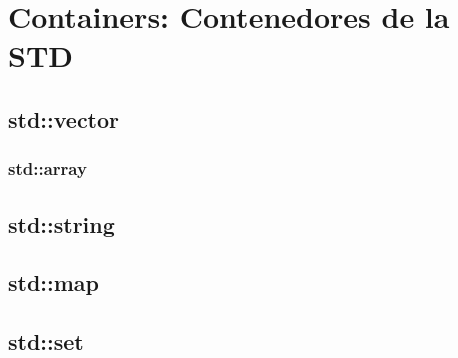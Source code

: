 \documentclass[12pt, fleqn]{report}                             %
\theoremstyle{break}                                            %
\begin{document}
    \clearpage
    \chapter{Containers: Contenedores de la STD}

        \section{std::vector}

            \subsection{std::array}

        
        \section{std::string}


        \section{std::map}

        \section{std::set}
\end{document}
